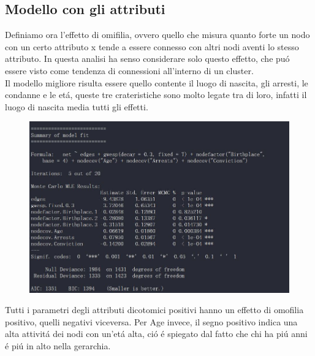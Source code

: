 \documentclass[11pt,a4paper]{report}
\begin{document}
\subsection{Modello con gli attributi}
Definiamo ora l'effetto di omifilia, ovvero quello che misura quanto forte un nodo con un certo attributo x tende a essere connesso con altri nodi aventi lo stesso attributo. In questa analisi ha senso considerare solo questo effetto, che pu\'o essere visto come tendenza di connessioni all'interno di un cluster.
\\
Il modello migliore risulta essere quello contente il luogo di nascita, gli arresti, le condanne e le et\'a, queste tre crateristiche sono molto legate tra di loro, infatti il luogo di nascita media tutti gli effetti.
\\
\begin{figure}[H]
	\centering
	\includegraphics[scale=0.75]{mod2}
\end{figure}
Tutti i parametri degli attributi dicotomici positivi hanno un effetto di omofilia positivo, quelli negativi viceversa. Per Age invece, il segno positivo indica una alta attivit\'a dei nodi con un'et\'a alta, ci\'o \'e spiegato dal fatto che chi ha pi\'u anni \'e pi\'u in alto nella gerarchia.
\\
\end{document}
